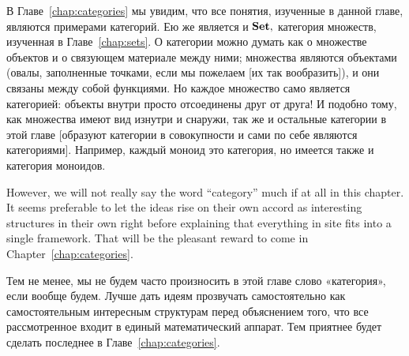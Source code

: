 \documentclass[CT4S-EN-RU]{subfiles}
\begin{document}
\begin{blockRUS}
В Главе~\ref{chap:categories} мы увидим, что все понятия, изученные в данной главе, являются примерами категорий. Ею же является и ${\mathbf{Set}},$ категория множеств, изученная в Главе~\ref{chap:sets}. О категории можно думать как о множестве объектов и о связующем материале между ними; множества являются объектами (овалы, заполненные точками, если мы пожелаем [их так вообразить]), и они связаны между собой функциями. Но каждое множество само является категорией: объекты внутри просто отсоединены друг от друга! И подобно тому, как множества имеют вид изнутри и снаружи, так же и остальные категории в этой главе [образуют категории в совокупности и сами по себе являются категориями]. Например, каждый моноид это категория, но имеется также и категория моноидов. 
\end{blockRUS}

\begin{blockENG}
However, we will not really say the word “category” much if at all in this chapter. It seems preferable to let the ideas rise on their own accord as interesting structures in their own right before explaining that everything in site fits into a single framework. That will be the pleasant reward to come in Chapter~\ref{chap:categories}.
\end{blockENG}

\begin{blockRUS}
Тем не менее, мы не будем часто произносить в этой главе слово «категория», если вообще будем. Лучше дать идеям прозвучать самостоятельно как самостоятельным интересным структурам перед объяснением того, что все рассмотренное входит в единый математический аппарат. Тем приятнее будет сделать последнее в Главе~\ref{chap:categories}.
\end{blockRUS}
\end{document}
